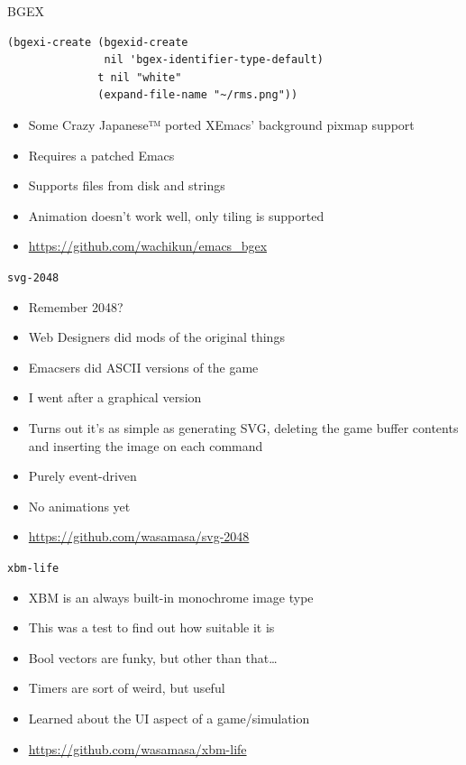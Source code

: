 \documentclass[presentation]{beamer}
\begin{document}
\begin{frame}[fragile,label=sec-3-3]{BGEX}
 \begin{verbatim}
(bgexi-create (bgexid-create
               nil 'bgex-identifier-type-default)
              t nil "white"
              (expand-file-name "~/rms.png"))
\end{verbatim}

\begin{itemize}
\item Some Crazy Japanese™ ported XEmacs' background pixmap support
\item Requires a patched Emacs
\item Supports files from disk and strings
\item Animation doesn't work well, only tiling is supported
\item \url{https://github.com/wachikun/emacs_bgex}
\end{itemize}
\end{frame}

\begin{frame}[fragile,label=sec-3-4]{\texttt{svg-2048}}
 \begin{itemize}
\item Remember 2048?
\item Web Designers did mods of the original things
\item Emacsers did ASCII versions of the game
\item I went after a graphical version
\item Turns out it's as simple as generating SVG, deleting the game buffer
contents and inserting the image on each command
\item Purely event-driven
\item No animations yet
\item \url{https://github.com/wasamasa/svg-2048}
\end{itemize}
\end{frame}

\begin{frame}[fragile,label=sec-3-5]{\texttt{xbm-life}}
 \begin{itemize}
\item XBM is an always built-in monochrome image type
\item This was a test to find out how suitable it is
\item Bool vectors are funky, but other than that\ldots{}
\item Timers are sort of weird, but useful
\item Learned about the UI aspect of a game/simulation
\item \url{https://github.com/wasamasa/xbm-life}
\end{itemize}
\end{frame}
\end{document}
